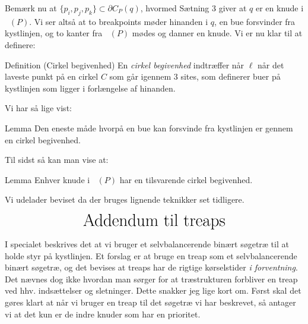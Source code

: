 \documentclass{beamer} %
\newcommand{\curly}[1]{\{#1\}}
\newcommand{\longpause}{\break \break \pause}
\DeclareMathOperator{\VorG}{Vor_{G}}
\begin{document}
\begin{frame}
\pause
Bemærk nu at $\curly{p_i, p_j, p_k} \subset \partial C_P(q)$\pause, hvormed Sætning 3 giver at $q$ er en knude i $\VorG(P)$. \pause Vi ser altså at to breakpoints møder hinanden i $q$, en bue forsvinder fra kystlinjen, og to kanter fra $\VorG(P)$ mødes og danner en knude. \pause Vi er nu klar til at definere:
\pause
\begin{block}{Definition (Cirkel begivenhed)}
\pause
En \textit{cirkel begivenhed} indtræffer når $\ell$ når det laveste punkt på en cirkel $C$ \pause som går igennem 3 sites, \pause som definerer buer på kystlinjen som ligger i forlængelse af hinanden.
\end{block}
\pause Vi har så lige vist: \pause
\begin{block}{Lemma}
\pause
Den eneste måde hvorpå en bue kan forsvinde fra kystlinjen er gennem en cirkel begivenhed.
\end{block}
\end{frame}


\begin{frame}
\pause
Til sidst så kan man vise at:
\pause
\begin{block}{Lemma}
\pause
Enhver knude i $\VorG(P)$ har en tilsvarende cirkel begivenhed.
\end{block}
\pause
Vi udelader beviset da der bruges lignende teknikker set tidligere.
\end{frame}

\begin{frame}
\pause
\[
	\huge\text{Addendum til treaps}
\]
\end{frame}

\begin{frame}
\pause
I specialet beskrives det at vi bruger et selvbalancerende binært søgetræ til at holde styr på kystlinjen.
\longpause
Et forslag er at bruge en treap som et selvbalancerende binært søgetræ, og det bevises at treaps har de rigtige kørselstider \textit{i forventning}.
\longpause
Det nævnes dog ikke hvordan man sørger for at træstrukturen forbliver en treap ved hhv. indsættelser og sletninger. \pause Dette snakker jeg lige kort om.
\longpause
Først skal det gøres klart at når vi bruger en treap til det søgetræ vi har beskrevet, så antager vi at det kun er de indre knuder som har en prioritet.
\end{frame}
\end{document}
